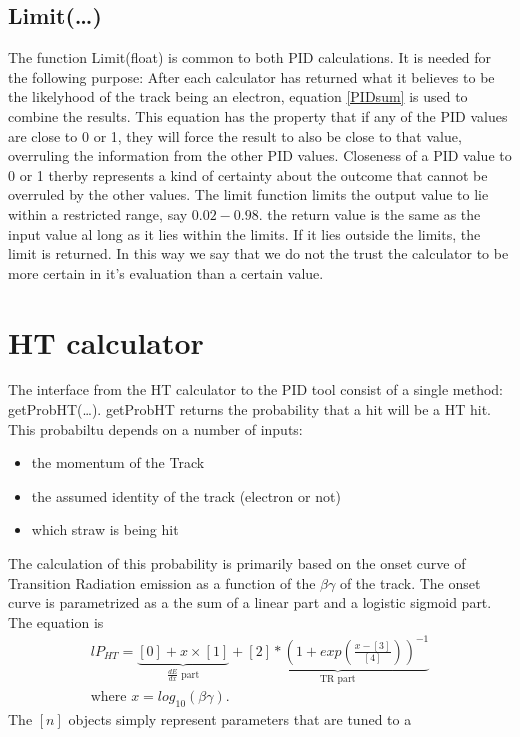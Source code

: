 \documentclass[a4paper,11pt]{article}
\begin{document}
\subsection{Limit(\ldots)}
The function Limit(float) is common to both PID calculations. It is
needed for the following purpose: After each calculator has returned
what it believes to be the likelyhood of the track being an electron,
equation \ref{PIDsum} is used to combine the results. This equation
has the property that if any of the PID values are close to 0 or 1,
they will force the result to also be close to that value, overruling
the information from the other PID values. Closeness of a PID value to
0 or 1 therby represents a kind of certainty about the outcome that
cannot be overruled by the other values. The limit function limits the
output value to lie within a restricted range, say $0.02-0.98$. the
return value is the same as the input value al long as it lies within
the limits. If it lies outside the limits, the limit is returned. In
this way we say that we do not the trust the calculator to be more
certain in it's evaluation than a certain value.

\section{HT calculator}
The interface from the HT calculator to the PID tool consist of a
single method: getProbHT(\ldots). getProbHT returns the probability
that a hit will be a HT hit. This probabiltu depends on a number of
inputs:
\begin{itemize}
  \item the momentum of the Track
  \item the assumed identity of the track (electron or not)
  \item which straw is being hit
\end{itemize}

The calculation of this probability is primarily based on the onset
curve of Transition Radiation emission as a function of the
$\beta\gamma$ of the track. The onset curve is parametrized as a the
sum of a linear part and a logistic sigmoid part. The equation is
\begin{eqnarray}{l}
  P_{HT}=\underbrace{[0]+x\times[1]}_{\frac{dE}{dx}\mbox{ part}}+\underbrace{[2]*\left(1+exp\left(\frac{x-[3]}{[4]}\right)\right)^{-1}}_{\mbox{TR part}}\\
  \mbox{where }x=log_{10}(\beta\gamma).
\end{eqnarray}
The $[n]$ objects simply represent parameters that are tuned to a
\end{document}
